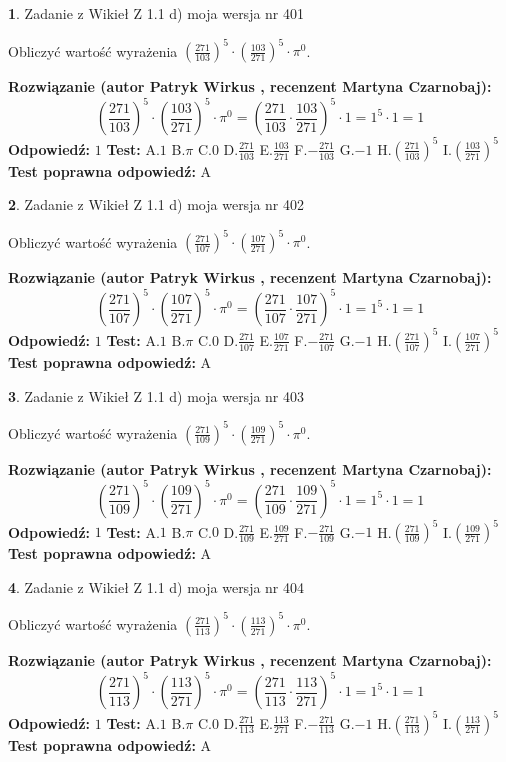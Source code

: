 \documentclass[12pt, a4paper]{article}
\theoremstyle{definition} %
\newtheorem{zad}{}
\newcommand{\zadStart}[1]{\begin{zad}#1\newline}
\newcommand{\zadStop}{\end{zad}}
\newcommand{\rozwStart}[2]{\noindent \textbf{Rozwiązanie (autor #1 , recenzent #2): }\newline}
\newcommand{\rozwStop}{\newline}
\newcommand{\odpStart}{\noindent \textbf{Odpowiedź:}\newline}
\newcommand{\odpStop}{\newline}
\newcommand{\testStart}{\noindent \textbf{Test:}\newline}
\newcommand{\testStop}{\newline}
\newcommand{\kluczStart}{\noindent \textbf{Test poprawna odpowiedź:}\newline}
\newcommand{\kluczStop}{\newline}
\begin{document}
\zadStart{Zadanie z Wikieł Z 1.1 d) moja wersja nr 401}

Obliczyć wartość wyrażenia $(\frac{271}{103})^{5} \cdot (\frac{103}{271})^{5} \cdot \pi^{0}$.
\zadStop
\rozwStart{Patryk Wirkus}{Martyna Czarnobaj}
$$(\frac{271}{103})^{5} \cdot (\frac{103}{271})^{5} \cdot \pi^{0} = (\frac{271}{103} \cdot \frac{103}{271})^{5} \cdot 1 = 1^{5} \cdot 1 = 1$$
\rozwStop
\odpStart
$1$
\odpStop
\testStart
A.$1$ B.$\pi$ C.$0$ D.$\frac{271}{103}$ E.$\frac{103}{271}$
F.$-\frac{271}{103}$ G.$-1$
H.$(\frac{271}{103})^{5}$
I.$(\frac{103}{271})^{5}$
\testStop
\kluczStart
A
\kluczStop



\zadStart{Zadanie z Wikieł Z 1.1 d) moja wersja nr 402}

Obliczyć wartość wyrażenia $(\frac{271}{107})^{5} \cdot (\frac{107}{271})^{5} \cdot \pi^{0}$.
\zadStop
\rozwStart{Patryk Wirkus}{Martyna Czarnobaj}
$$(\frac{271}{107})^{5} \cdot (\frac{107}{271})^{5} \cdot \pi^{0} = (\frac{271}{107} \cdot \frac{107}{271})^{5} \cdot 1 = 1^{5} \cdot 1 = 1$$
\rozwStop
\odpStart
$1$
\odpStop
\testStart
A.$1$ B.$\pi$ C.$0$ D.$\frac{271}{107}$ E.$\frac{107}{271}$
F.$-\frac{271}{107}$ G.$-1$
H.$(\frac{271}{107})^{5}$
I.$(\frac{107}{271})^{5}$
\testStop
\kluczStart
A
\kluczStop



\zadStart{Zadanie z Wikieł Z 1.1 d) moja wersja nr 403}

Obliczyć wartość wyrażenia $(\frac{271}{109})^{5} \cdot (\frac{109}{271})^{5} \cdot \pi^{0}$.
\zadStop
\rozwStart{Patryk Wirkus}{Martyna Czarnobaj}
$$(\frac{271}{109})^{5} \cdot (\frac{109}{271})^{5} \cdot \pi^{0} = (\frac{271}{109} \cdot \frac{109}{271})^{5} \cdot 1 = 1^{5} \cdot 1 = 1$$
\rozwStop
\odpStart
$1$
\odpStop
\testStart
A.$1$ B.$\pi$ C.$0$ D.$\frac{271}{109}$ E.$\frac{109}{271}$
F.$-\frac{271}{109}$ G.$-1$
H.$(\frac{271}{109})^{5}$
I.$(\frac{109}{271})^{5}$
\testStop
\kluczStart
A
\kluczStop



\zadStart{Zadanie z Wikieł Z 1.1 d) moja wersja nr 404}

Obliczyć wartość wyrażenia $(\frac{271}{113})^{5} \cdot (\frac{113}{271})^{5} \cdot \pi^{0}$.
\zadStop
\rozwStart{Patryk Wirkus}{Martyna Czarnobaj}
$$(\frac{271}{113})^{5} \cdot (\frac{113}{271})^{5} \cdot \pi^{0} = (\frac{271}{113} \cdot \frac{113}{271})^{5} \cdot 1 = 1^{5} \cdot 1 = 1$$
\rozwStop
\odpStart
$1$
\odpStop
\testStart
A.$1$ B.$\pi$ C.$0$ D.$\frac{271}{113}$ E.$\frac{113}{271}$
F.$-\frac{271}{113}$ G.$-1$
H.$(\frac{271}{113})^{5}$
I.$(\frac{113}{271})^{5}$
\testStop
\kluczStart
A
\kluczStop
\end{document}
